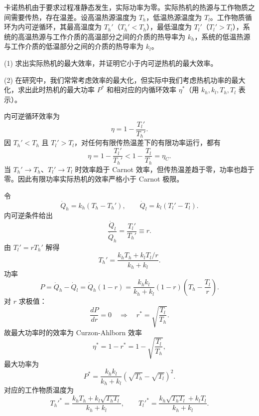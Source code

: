 \begin{question}
卡诺热机由于要求过程准静态发生，实际功率为零。实际热机的热源与工作物质之间需要传热，存在温差。设高温热源温度为 $T_h$，低温热源温度为 $T_l$。工作物质循环为内可逆循环，其最高温度为 $T_h'$（$T_h'<T_h$），最低温度为 $T_l'$（$T_l'>T_l$），系统的高温热源与工作介质的高温部分之间的介质的热导率为 $k_h$，系统的低温热源与工作介质的低温部分之间的介质的热导率为 $k_l$。

(1) 求出实际热机的最大效率，并证明它小于内可逆热机的最大效率。

(2) 在研究中，我们常常考虑效率的最大化，但实际中我们考虑热机功率的最大化，求出此时热机的最大功率 $P^*$ 和相对应的内循环效率 $\eta^*$（用 $k_h,k_l,T_h,T_l$ 表示）。
\begin{solution}
内可逆循环效率为
\[
\eta=1-\frac{T_l'}{T_h'}.
\]
因 $T_h'<T_h$ 且 $T_l'>T_l$，对任何有限传热温差下的有限功率运行，都有
\[
\eta=1-\frac{T_l'}{T_h'}<1-\frac{T_l}{T_h}=\eta_C.
\]
当 $T_h'\to T_h$、$T_l'\to T_l$ 时效率趋于 Carnot 效率，但传热温差趋于零，功率也趋于零。因此有限功率实际热机的效率严格小于 Carnot 极限。

令
\[
\dot Q_h=k_h(T_h-T_h'),
\qquad
\dot Q_l=k_l(T_l'-T_l).
\]
内可逆条件给出
\[
\frac{\dot Q_l}{\dot Q_h}=\frac{T_l'}{T_h'}\equiv r.
\]
由 $T_l'=rT_h'$ 解得
\[
T_h'=\frac{k_hT_h+k_lT_l/r}{k_h+k_l}.
\]
功率
\[
P=\dot Q_h-\dot Q_l=\dot Q_h(1-r)
=\frac{k_hk_l}{k_h+k_l}(1-r)\left(T_h-\frac{T_l}{r}\right).
\]
对 $r$ 求极值：
\[
\frac{dP}{dr}=0
\quad\Rightarrow\quad
r^*=\sqrt{\frac{T_l}{T_h}}.
\]
故最大功率时的效率为 Curzon-Ahlborn 效率
\[
\eta^*=1-r^*=1-\sqrt{\frac{T_l}{T_h}},
\]
最大功率为
\[
P^*=\frac{k_hk_l}{k_h+k_l}\left(\sqrt{T_h}-\sqrt{T_l}\right)^2.
\]
对应的工作物质温度为
\[
T_h'^*=\frac{k_hT_h+k_l\sqrt{T_hT_l}}{k_h+k_l},
\qquad
T_l'^*=\frac{k_h\sqrt{T_hT_l}+k_lT_l}{k_h+k_l}.
\]
\end{solution}
\end{question}

